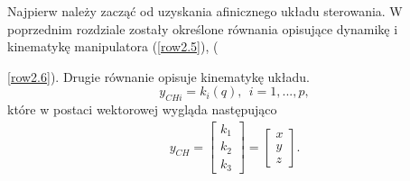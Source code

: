 \documentclass[eng,printmode]{mgr}
\begin{document}
Najpierw należy zacząć od uzyskania afinicznego układu sterowania. 
W poprzednim rozdziale zostały określone równania opisujące dynamikę i kinematykę manipulatora (\ref{row2.5}), ({\ref{row2.6}).
Drugie równanie opisuje kinematykę układu.
\begin{equation}\label{row3.1}
y_{CHi}=k_i(q),\ \ i=1,...,p,
\end{equation}
które w postaci wektorowej wygląda następująco
\begin{eqnarray}
 y_{CH}=\left[
        \begin{array}{c}
         k_1\\ 
        k_2\\
         k_3
         \end{array}
      \right]=\left[
        \begin{array}{c}
         x\\ 
        y\\
        z
         \end{array}
      \right].
\end{eqnarray}


}
\end{document}
